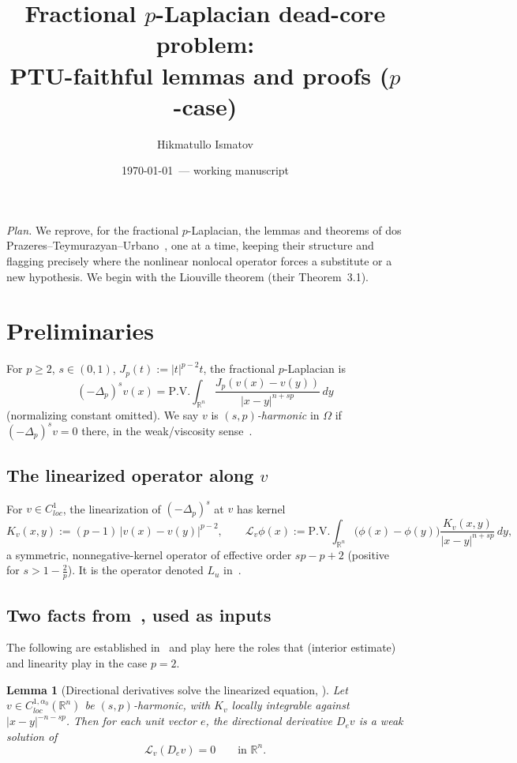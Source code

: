 \documentclass[11pt]{amsart}
\title{Fractional $p$-Laplacian dead-core problem:\\
PTU-faithful lemmas and proofs ($p$-case)}
\author{Hikmatullo Ismatov}
\date{\today\ --- working manuscript}
\theoremstyle{plain}
\newtheorem{lemma}[theorem]{Lemma}
\theoremstyle{definition}
\theoremstyle{remark}
\newcommand{\R}{\mathbb{R}}
\newcommand{\fpl}[1]{(-\Delta_p)^{s}#1}
\newcommand{\Jp}[1]{|#1|^{p-2}#1}
\newcommand{\Lv}{\mathcal L_{v}}
\newcommand{\al}{\alpha}
\begin{document}
\maketitle

\noindent\emph{Plan.} We reprove, for the fractional $p$-Laplacian, the
lemmas and theorems of dos Prazeres--Teymurazyan--Urbano~\cite{PTU}, one at a
time, keeping their structure and flagging precisely where the nonlinear
nonlocal operator forces a substitute or a new hypothesis. We begin with the
Liouville theorem (their Theorem~3.1).

\section{Preliminaries}\label{sec:prelim}
For $p\ge2$, $s\in(0,1)$, $J_p(t):=\Jp{t}$, the fractional $p$-Laplacian is
\[
  \fpl{v}(x)=\mathrm{P.V.}\!\int_{\R^n}\frac{J_p(v(x)-v(y))}{|x-y|^{n+sp}}\,dy
\]
(normalizing constant omitted). We say $v$ is \emph{$(s,p)$-harmonic} in
$\Omega$ if $\fpl{v}=0$ there, in the weak/viscosity sense~\cite{KKL}.

\subsection{The linearized operator along $v$}
For $v\in C^1_{loc}$, the linearization of $\fpl{}$ at $v$ has kernel
\[
  K_v(x,y):=(p-1)\,|v(x)-v(y)|^{p-2},\qquad
  \Lv\phi(x):=\mathrm{P.V.}\!\int_{\R^n}\big(\phi(x)-\phi(y)\big)
   \frac{K_v(x,y)}{|x-y|^{n+sp}}\,dy,
\]
a symmetric, nonnegative-kernel operator of effective order $sp-p+2$ (positive
for $s>1-\tfrac2p$). It is the operator denoted $L_u$ in~\cite[(2.1)--(2.2)]{GJS}.

\subsection{Two facts from~\cite{GJS}, used as inputs}
The following are established in~\cite{GJS} and play here the roles that
\cite[Thm 2.2]{PTU} (interior estimate) and linearity play in the case $p=2$.

\begin{lemma}[Directional derivatives solve the linearized equation, {\cite[\S3,\S9]{GJS}}]\label{lem:der-eq}
Let $v\in C^{1,\al_0}_{loc}(\R^n)$ be $(s,p)$-harmonic, with $K_v$ locally
integrable against $|x-y|^{-n-sp}$. Then for each unit vector $e$, the
directional derivative $D_e v$ is a weak solution of
\[
  \Lv (D_e v)=0\qquad\text{in }\R^n.
\]
\end{lemma}
\end{document}
